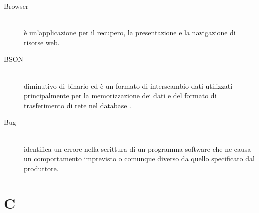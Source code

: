 \documentclass[12pt,a4paper]{article}
\begin{document}
\begin{description}
\item[Browser]
\hfill\\ è un'applicazione per il recupero, la presentazione e la navigazione di risorse web.

\item[BSON]
\hfill\\ diminutivo di  binario ed è un formato di interscambio dati utilizzati principalmente per la memorizzazione dei dati e del formato di trasferimento di rete nel database .

\item[Bug]
\hfill\\ identifica un errore nella scrittura di un programma software che ne causa un comportamento imprevisto o comunque diverso da quello specificato dal produttore.
\end{description}

\newpage

\section{C}
\end{document}
